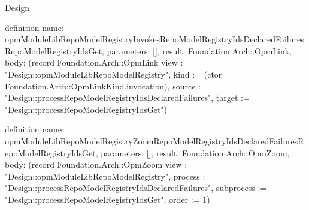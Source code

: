 \begin{lexlean}{Design}
\begin{semanticmodule}
definition{
  name: opmModuleLibRepoModelRegistryInvokesRepoModelRegistryIdsDeclaredFailuresRepoModelRegistryIdsGet,
  parameters: [],
  result: Foundation.Arch::OpmLink,
  body: (record Foundation.Arch::OpmLink {view := "Design::opmModuleLibRepoModelRegistry", kind := (ctor Foundation.Arch::OpmLinkKind.invocation), source := "Design::processRepoModelRegistryIdsDeclaredFailures", target := "Design::processRepoModelRegistryIdsGet"})
}

definition{
  name: opmModuleLibRepoModelRegistryZoomRepoModelRegistryIdsDeclaredFailuresRepoModelRegistryIdsGet,
  parameters: [],
  result: Foundation.Arch::OpmZoom,
  body: (record Foundation.Arch::OpmZoom {view := "Design::opmModuleLibRepoModelRegistry", process := "Design::processRepoModelRegistryIdsDeclaredFailures", subprocess := "Design::processRepoModelRegistryIdsGet", order := 1})
}
\end{semanticmodule}
\end{lexlean}
